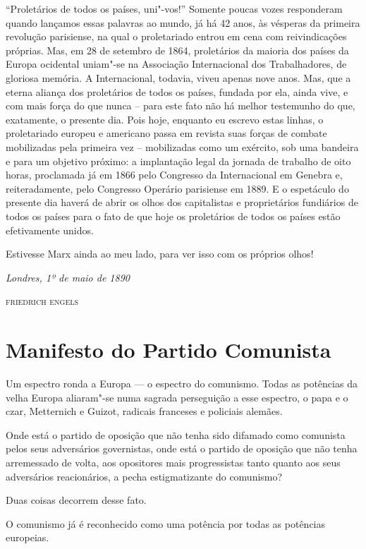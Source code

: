  “Proletários de todos os países, uni"-vos!” Somente poucas vozes
responderam quando lançamos essas palavras ao mundo, já há 42 anos, às vésperas da primeira revolução parisiense, na qual o
proletariado entrou em cena com reivindicações próprias. Mas, em 28 de
setembro de 1864, proletários da maioria dos países da Europa ocidental
uniam"-se na Associação Internacional dos Trabalhadores, de gloriosa
memória. A Internacional, todavia, viveu apenas nove anos. Mas, que a
eterna aliança dos proletários de todos os países, fundada por ela,
ainda vive, e com mais força do que nunca – para este fato não há
melhor testemunho do que, exatamente, o presente dia. Pois hoje, enquanto
eu escrevo estas linhas, o proletariado europeu e americano passa em
revista suas forças de combate mobilizadas pela primeira vez –
mobilizadas como um exército, sob uma bandeira e para um objetivo
próximo: a implantação legal da jornada de trabalho de oito horas,
proclamada já em 1866 pelo Congresso da Internacional em Genebra e,
reiteradamente, pelo Congresso Operário parisiense em 1889. E o
espetáculo do presente dia haverá de abrir os olhos dos capitalistas e
proprietários fundiários de todos os países para o fato de que hoje os
proletários de todos os países estão efetivamente unidos.

Estivesse Marx ainda ao meu lado, para ver isso com os próprios olhos!
\bigskip

\hfill \textit{Londres, 1º de maio de 1890}

\hfill \textsc{friedrich engels}


\chapter{Manifesto do Partido Comunista}


Um espectro ronda a Europa  ---  o espectro do comunismo. Todas as 
potências da velha Europa aliaram"-se numa sagrada perseguição a esse 
espectro, o papa e o czar, Metternich e Guizot, radicais franceses e policiais alemães.

Onde está o partido de oposição que não tenha sido difamado como
comunista pelos seus adversários governistas, onde está o partido de
oposição que não tenha arremessado de volta, aos opositores mais
progressistas tanto quanto aos seus adversários reacionários, a pecha
estigmatizante do comunismo?

Duas coisas decorrem desse fato.

O comunismo já é reconhecido como uma potência por todas as potências
europeias.

